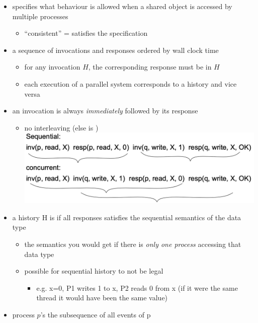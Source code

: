 \documentclass[10pt, landscape]{article}
\begin{document}
\begin{multicols*}{3}
  \begin{itemize}
    \item {} specifies what behaviour is allowed when a shared object is accessed by multiple processes
      \begin{itemize}
        \item “consistent” = satisfies the specification
      \end{itemize}
    \item {} a sequence of invocations and responses ordered by wall clock time
      \begin{itemize}
        \item for any invocation $H$, the corresponding response must be in $H$
        \item each execution of a parallel system corresponds to a history and vice versa
      \end{itemize}
    \item {} an invocation is always \textit{immediately} followed by its response 
      \begin{itemize}
        \item no interleaving (else is )
          \includegraphics[width=0.7\linewidth]{cs4231-sequential-concurrent.png} 
      \end{itemize}
    \item a history H is  if all responses satisfies the sequential semantics of the data type
      \begin{itemize}
        \item {} the semantics you would get if there is \textit{only one process} accessing that data type
        \item possible for sequential history to not be legal
          \begin{itemize}
            \item e.g. x=0, P1 writes 1 to x, P2 reads 0 from x (if it were the same thread it would have been the same value)
          \end{itemize}
      \end{itemize}
    \item process $p$’s  the subsequence of all events of p

\end{itemize}
\end{multicols*}
\end{document}
